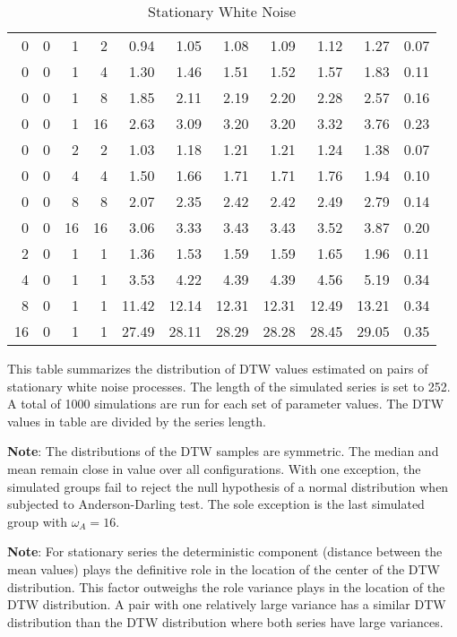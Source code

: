 \documentclass[12pt]{article}
\begin{document}
\begin{table}[!ht]
\begin{center}
\begin{tabular}{r r r r | r r r r r r r}
        \midrule
        0  & 0 & 1  & 2  & 0.94 & 1.05 & 1.08 & 1.09 & 1.12 & 1.27 & 0.07 \\
        0  & 0 & 1  & 4  & 1.30 & 1.46 & 1.51 & 1.52 & 1.57 & 1.83 & 0.11 \\
        0  & 0 & 1  & 8  & 1.85 & 2.11 & 2.19 & 2.20 & 2.28 & 2.57 & 0.16 \\
        0  & 0 & 1  & 16 & 2.63 & 3.09 & 3.20 & 3.20 & 3.32 & 3.76 & 0.23 \\
        \midrule
        0  & 0 & 2  & 2  & 1.03 & 1.18 & 1.21 & 1.21 & 1.24 & 1.38 & 0.07 \\
        0  & 0 & 4  & 4  & 1.50 & 1.66 & 1.71 & 1.71 & 1.76 & 1.94 & 0.10 \\
        0  & 0 & 8  & 8  & 2.07 & 2.35 & 2.42 & 2.42 & 2.49 & 2.79 & 0.14 \\
        0  & 0 & 16 & 16 & 3.06 & 3.33 & 3.43 & 3.43 & 3.52 & 3.87 & 0.20 \\
        \midrule
        2  & 0 & 1  & 1  &  1.36 &  1.53 &  1.59 &  1.59 &  1.65 &  1.96 & 0.11 \\
        4  & 0 & 1  & 1  &  3.53 &  4.22 &  4.39 &  4.39 &  4.56 &  5.19 & 0.34 \\
        8  & 0 & 1  & 1  & 11.42 & 12.14 & 12.31 & 12.31 & 12.49 & 13.21 & 0.34 \\
        16 & 0 & 1  & 1  & 27.49 & 28.11 & 28.29 & 28.28 & 28.45 & 29.05 & 0.35 \\
        \hline
      \end{tabular}
    \caption{Stationary White Noise} \label{tbl:dtw_white_noise}
    \end{center}
    \begin{tablenotes}
        \item{\footnotesize This table summarizes the distribution of DTW values estimated on pairs of stationary white noise processes. The length of the simulated series is set to 252. A total of 1000 simulations are run for each set of parameter values. The DTW values in table are divided by the series length.}
        \item{\footnotesize \textbf{Note}: The distributions of the DTW samples are symmetric. The median and mean remain close in value over all configurations. With one exception, the simulated groups fail to reject the null hypothesis of a normal distribution when subjected to Anderson-Darling test. The sole exception is the last simulated group with $\omega_{A}=16$.}
        \item{\footnotesize \textbf{Note}: For stationary series the deterministic component (distance between the mean values) plays the definitive role in the location of the center of the DTW distribution. This factor outweighs the role variance plays in the location of the DTW distribution. A pair with one relatively large variance has a similar DTW distribution than the DTW distribution where both series have large variances.}

\end{tablenotes}
\end{table}
\end{document}
